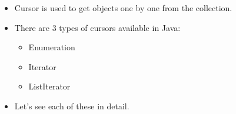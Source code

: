 \setlength{\columnsep}{3pt}
\begin{flushleft}
	
	\begin{itemize}
		\item Cursor is used to get objects one by one from the collection.
		\item There are 3 types of cursors available in Java:
		
		\begin{itemize}
			\item Enumeration
			\item Iterator
			\item ListIterator
		\end{itemize}
	
		\item Let's see each of these in detail.
	\end{itemize}
	
\end{flushleft}

